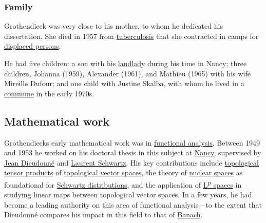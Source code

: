 \subsubsection{Family}\label{Family}

Grothendieck was very close to his mother, to whom he dedicated his dissertation. She died in 1957 from \href{https://en.wikipedia.org/wiki/Tuberculosis}{tuberculosis} that she contracted in camps for \href{https://en.wikipedia.org/wiki/Displaced_persons}{displaced persons}.

He had five children: a son with his \href{https://en.wikipedia.org/wiki/Landlady}{landlady} during his time in Nancy; three children, Johanna (1959), Alexander (1961), and Mathieu (1965) with his wife Mireille Dufour; and one child with Justine Skalba, with whom he lived in a \href{https://en.wikipedia.org/wiki/Intentional_community}{commune} in the early 1970s.


\subsection{Mathematical work}\label{Mathematical_work}

Grothendieck\textquotesingle s early mathematical work was in \href{https://en.wikipedia.org/wiki/Functional_analysis}{functional analysis}. Between 1949 and 1953 he worked on his doctoral thesis in this subject at \href{https://en.wikipedia.org/wiki/Nancy,_France}{Nancy}, supervised by \href{https://en.wikipedia.org/wiki/Jean_Dieudonné}{Jean Dieudonné} and \href{https://en.wikipedia.org/wiki/Laurent_Schwartz}{Laurent Schwartz}. His key contributions include \href{https://en.wikipedia.org/wiki/Topological_tensor_product}{topological tensor products} of \href{https://en.wikipedia.org/wiki/Topological_vector_space}{topological vector spaces}, the theory of \href{https://en.wikipedia.org/wiki/Nuclear_space}{nuclear spaces} as foundational for \href{https://en.wikipedia.org/wiki/Schwartz_distribution}{Schwartz distributions}, and the application of \href{https://en.wikipedia.org/wiki/Lp_space}{L\textsuperscript{p} spaces} in studying linear maps between topological vector spaces. In a few years, he had become a leading authority on this area of functional analysis---to the extent that Dieudonné compares his impact in this field to that of \href{https://en.wikipedia.org/wiki/Stefan_Banach}{Banach}.

